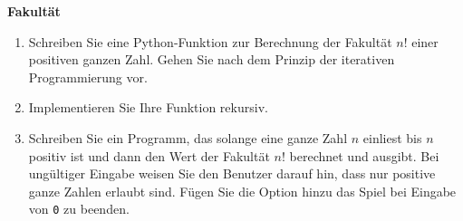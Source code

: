 \textbf{Fakultät}
\begin{enumerate}
	\item Schreiben Sie eine Python-Funktion zur Berechnung der Fakultät $n!$ einer positiven ganzen Zahl. Gehen Sie nach dem Prinzip der iterativen Programmierung vor.
	\item Implementieren Sie Ihre Funktion rekursiv.
	\item Schreiben Sie ein Programm, das solange eine ganze Zahl $n$ einliest bis $n$ positiv ist und dann den Wert der Fakultät $n!$ berechnet und ausgibt. Bei ungültiger Eingabe weisen Sie den Benutzer darauf hin, dass nur positive ganze Zahlen erlaubt sind. Fügen Sie die Option hinzu das Spiel bei Eingabe von \texttt{0} zu beenden.
\end{enumerate}

